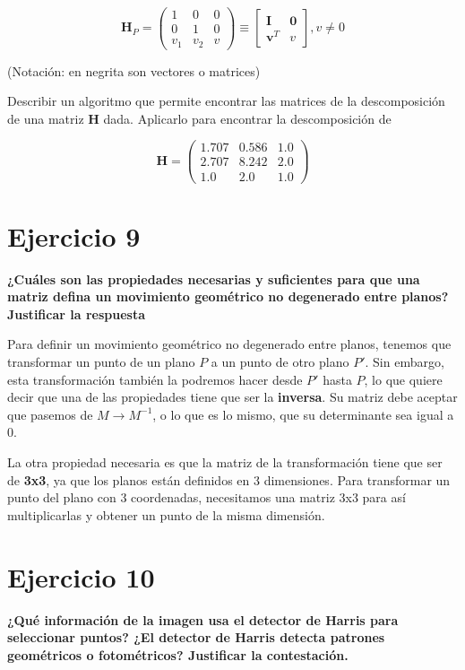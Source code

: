\documentclass[11pt,a4paper]{article}
\begin{document}
$$\mathbf{H}_P = \begin{pmatrix} 1 & 0 & 0 \\ 0 & 1 &0 \\ v_1 & v_2 & v \end{pmatrix} \equiv
\begin{bmatrix} \mathbf{I} & \mathbf{0} \\ \mathbf{v}^T & v \end{bmatrix}, v \neq 0$$

(Notación: en negrita son vectores o matrices)

Describir un algoritmo que permite encontrar las matrices de la
descomposición de una matriz $\mathbf{H}$ dada. Aplicarlo para encontrar la
descomposición de

$$
  \mathbf{H} = \begin{pmatrix}
  1.707 & 0.586 & 1.0 \\
  2.707 & 8.242 & 2.0 \\
  1.0 & 2.0 & 1.0
  \end{pmatrix}
$$



\section*{Ejercicio 9}
\textbf{¿Cuáles son las propiedades necesarias y suficientes para que una matriz defina un movimiento geométrico no degenerado entre planos? Justificar
la respuesta}

Para definir un movimiento geométrico no degenerado entre planos, tenemos que transformar un punto de un plano $P$ a un punto de otro plano $P'$. Sin embargo,
esta transformación también la podremos hacer desde $P'$ hasta $P$, lo que quiere decir que una de las propiedades tiene que ser la \textbf{inversa}. Su
matriz debe aceptar que pasemos de $M \rightarrow M^{-1}$, o lo que es lo mismo, que su determinante sea igual a 0.

La otra propiedad necesaria es que la matriz de la transformación tiene que ser de \textbf{3x3}, ya que los planos están definidos en 3 dimensiones.
Para transformar un punto del plano con 3 coordenadas, necesitamos una matriz 3x3 para así multiplicarlas y obtener un punto de la misma dimensión.


\section*{Ejercicio 10}
\textbf{¿Qué información de la imagen usa el detector de Harris para seleccionar puntos? ¿El detector de Harris detecta patrones geométricos o fotométricos?
Justificar la contestación.}
\end{document}
